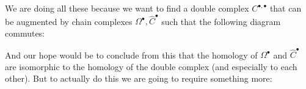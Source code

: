 We are doing all these because we want to find a double complex
$C^{\bullet, \bullet}$ that can be augmented by chain complexes
$\Omega^\bullet, \hat{C}^\bullet$ such that the following diagram commutes:
\begin{center}
\end{center}
And our hope would be to conclude from this that the homology of
$\Omega^\bullet$ and $\hat{C}^\bullet$ are isomorphic to the homology of
the double complex (and especially to each other). But to actually do this
we are going to require something more:
